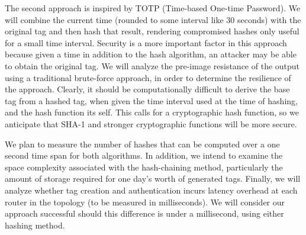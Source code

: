 \documentclass[12pt]{article} %
\begin{document}
The second approach is inspired by TOTP (Time-based One-time Password). We will combine the current time (rounded to some interval like 30 seconds) with the original tag and then hash that result, rendering compromised hashes only useful for a small time interval. Security is a more important factor in this approach because given a time in addition to the hash algorithm, an attacker may be able to obtain the original tag. We will analyze the pre-image resistance of the output using a traditional brute-force approach, in order to determine the resilience of the approach. Clearly, it should be computationally difficult to derive the base tag from a hashed tag, when given the time interval used at the time of hashing, and the hash function its self. This calls for a cryptographic hash function, so we anticipate that SHA-1 and stronger cryptographic functions will be more secure. 

We plan to measure the number of hashes that can be computed over a one second time span for both algorithms. In addition, we intend to examine the space complexity associated with the hash-chaining method, particularly the amount of storage required for one day's worth of generated tags. Finally, we will analyze whether tag creation and authentication incurs latency overhead at each router in the topology (to be measured in milliseconds). We will consider our approach successful should this difference is under a millisecond, using either hashing method.








\end{document}
